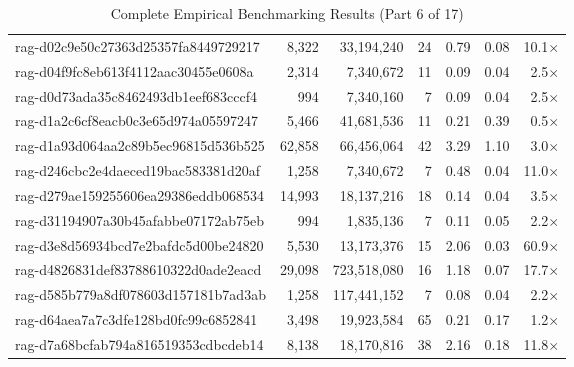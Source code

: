 \begin{table}[h!]
\begin{tabular}{lrrrrrr}
rag-d02c9e50c27363d25357fa8449729217 & 8,322 & 33,194,240 & 24 & 0.79 & 0.08 & 10.1$\times$ \\
rag-d04f9fc8eb613f4112aac30455e0608a & 2,314 & 7,340,672 & 11 & 0.09 & 0.04 & 2.5$\times$ \\
rag-d0d73ada35c8462493db1eef683cccf4 & 994 & 7,340,160 & 7 & 0.09 & 0.04 & 2.5$\times$ \\
rag-d1a2c6cf8eacb0c3e65d974a05597247 & 5,466 & 41,681,536 & 11 & 0.21 & 0.39 & 0.5$\times$ \\
rag-d1a93d064aa2c89b5ec96815d536b525 & 62,858 & 66,456,064 & 42 & 3.29 & 1.10 & 3.0$\times$ \\
rag-d246cbc2e4daeced19bac583381d20af & 1,258 & 7,340,672 & 7 & 0.48 & 0.04 & 11.0$\times$ \\
rag-d279ae159255606ea29386eddb068534 & 14,993 & 18,137,216 & 18 & 0.14 & 0.04 & 3.5$\times$ \\
rag-d31194907a30b45afabbe07172ab75eb & 994 & 1,835,136 & 7 & 0.11 & 0.05 & 2.2$\times$ \\
rag-d3e8d56934bcd7e2bafdc5d00be24820 & 5,530 & 13,173,376 & 15 & 2.06 & 0.03 & 60.9$\times$ \\
rag-d4826831def83788610322d0ade2eacd & 29,098 & 723,518,080 & 16 & 1.18 & 0.07 & 17.7$\times$ \\
rag-d585b779a8df078603d157181b7ad3ab & 1,258 & 117,441,152 & 7 & 0.08 & 0.04 & 2.2$\times$ \\
rag-d64aea7a7c3dfe128bd0fc99c6852841 & 3,498 & 19,923,584 & 65 & 0.21 & 0.17 & 1.2$\times$ \\
rag-d7a68bcfab794a816519353cdbcdeb14 & 8,138 & 18,170,816 & 38 & 2.16 & 0.18 & 11.8$\times$ \\
\bottomrule
\end{tabular}
\caption{Complete Empirical Benchmarking Results (Part 6 of 17)}
\end{table}

\clearpage


